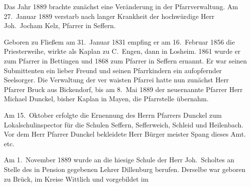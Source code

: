 

\pstart
Das Jahr 1889 brachte zunächst eine Veränderung in\ob
der Pfarrverwaltung. Am 27.\ Januar 1889 verstarb\ob
nach langer Krankheit der hochwürdige Herr Joh.\ Jocham
Kelz, Pfarrer in Seffern.

Geboren zu Fließem am 31.\ Januar 1831 empfing er\ob
am 16.\ Februar 1856 die Priesterweihe, wirkte als\ob
Kaplan zu C.\ Engen, dann in Losheim. 1861\ob
wurde er zum Pfarrer in Bettingen und 1868 zum\ob
Pfarrer in Seffern ernannt. Er war seinen Submittenten\ob
ein lieber Freund und seinen Pfarrkindern ein\ob
aufopfernder Seelsorger. Die Verwaltung der ver\ohb
waisten Pfarrei hatte nun zunächst Herr Pfarrer\ob
Bruck aus Bickendorf, bis am 8.\ Mai 1889\ob
der neuernannte Pfarrer Herr Michael Dunckel,\ob
bisher Kaplan in Mayen, die Pfarrstelle übernahm.

Am 15.\ Oktober erfolgte die Ernennung des Herrn\ob
Pfarrers Dunckel zum Lokalschulinspector für die\ob
Schulen Seffern, Sefferweich, Schleid und Heilenbach.\ob
Vor dem Herr Pfarrer Dunckel bekleidete Herr Bürger\ohb
meister Spang dieses Amt. etc.

Am 1.\ November 1889 wurde an die hiesige Schule der\ob
Herr Joh.\ Scholtes an Stelle des in Pension gegebenen\ob
Lehrer Dillenburg berufen. Derselbe war geboren zu\ob
Brück, im Kreise Wittlich und vorgebildet im
\pend
